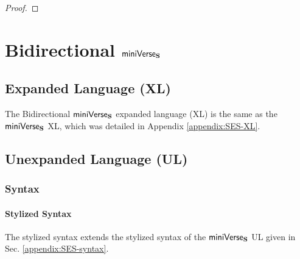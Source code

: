 \begin{theorem}
\begin{enumerate}
\end{enumerate}
\end{theorem}
\begin{proof}  \end{proof}

\chapter{Bidirectional $\mathsf{miniVerse}_\textbf{S}$}\label{appendix:simple-implicits}

\section{Expanded Language (XL)}
The Bidirectional $\mathsf{miniVerse}_\textbf{S}$ expanded language (XL) is the same as the  $\mathsf{miniVerse}_\textbf{S}$ XL, which was detailed in Appendix \ref{appendix:SES-XL}. %

\section{Unexpanded Language (UL)}
\subsection{Syntax}
\subsubsection{Stylized Syntax}
The stylized syntax extends the stylized syntax of the $\mathsf{miniVerse}_\textbf{S}$ UL given in Sec. \ref{appendix:SES-syntax}.

